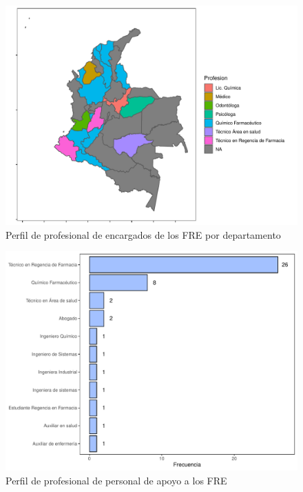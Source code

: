 \documentclass[
]{book}
\begin{document}
\begin{figure}
\includegraphics[width=0.85\linewidth]{InformeFinal_files/figure-latex/perfilProfesionalDepartamentos1-1} \caption{Perfil de profesional de encargados de los FRE por departamento}\label{fig:perfilProfesionalDepartamentos1}
\end{figure}

\begin{figure}
\includegraphics[width=0.9\linewidth]{InformeFinal_files/figure-latex/perfilProfesional2-1} \caption{Perfil de profesional de personal de apoyo a los FRE}\label{fig:perfilProfesional2}
\end{figure}
\end{document}
